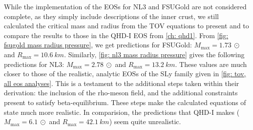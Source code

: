 While the implementation of the EOSs for NL3 and FSUGold are not considered complete, as they simply include descriptions of the inner crust, we still calculated the critical mass and radius from the TOV equations to present and to compare the results to those in the QHD-I EOS from \autoref{ch: qhd1}. From \autoref{fig: fsugold mass radius pressure}, we get predictions for FSUGold: $M_\text{max} = \SI{1.73}{\odot}$ and $R_\text{max} = \SI{10.6}{km}$. Similarly, \autoref{fig: nl3 mass radius pressure} gives the following predictions for NL3: $M_\text{max} = \SI{2.78}{\odot}$ and $R_\text{max} = \SI{13.2}{km}$. These values are much closer to those of the realistic, analytic EOSs of the SLy family given in \autoref{fig: tov, all eos analyses}. This is a testament to the additional steps taken within their derivation: the inclusion of the rho-meson field, and the additional constraints present to satisfy beta-equilibrium. These steps make the calculated equations of state much more realistic. In comparision, the predictions that QHD-I makes ($M_\text{max} = \SI{6.1}{\odot}$ and $R_\text{max} = \SI{42.1}{km}$) seem quite unrealistic.